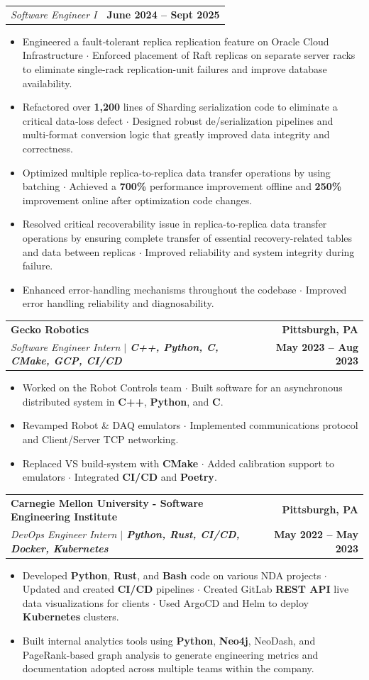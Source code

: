 \documentclass[letterpaper,11pt]{article}
\makeatletter
\newcommand{\resumeItem}[1]{
  \item\small{
    {#1 \vspace{-2pt}}
  }
}
\newcommand{\resumeSubheading}[4]{
  \vspace{-2pt}\item
    \begin{tabular*}{1.0\textwidth}[t]{l@{\extracolsep{\fill}}r}
      \textbf{#1} & \textbf{\small #4}\\
      \textit{\small#3} & \textbf{\small #2}\\
    \end{tabular*}\vspace{-7pt}
}
\newcommand{\resumeSubheadingPromotion}[2]{
  \vspace{-2pt}\item
    \begin{tabular*}{1.0\textwidth}[t]{l@{\extracolsep{\fill}}r}
      \textit{\small#1} & \textbf{\small #2} \\
    \end{tabular*}\vspace{-7pt}
}
\newcommand{\resumeItemListStart}{\begin{itemize}}
\newcommand{\resumeItemListEnd}{\end{itemize}\vspace{-5pt}}
\makeatother
\begin{document}
    \vspace{-1pt}

    \resumeSubheadingPromotion
    {Software Engineer I}{June 2024 -- Sept 2025}
    \resumeItemListStart
    \resumeItem {Engineered a fault‑tolerant replica replication feature on Oracle Cloud Infrastructure $\cdot$ 
    Enforced placement of Raft replicas on separate server racks to eliminate single‑rack replication-unit failures and improve database availability.}
    \resumeItem {Refactored over \textbf{1,200} lines of Sharding serialization code to eliminate a critical data‑loss defect $\cdot$
     Designed robust de/serialization pipelines and multi‑format conversion logic that 
     greatly improved data integrity and correctness.}
    \resumeItem {Optimized multiple replica-to-replica data transfer operations by using batching $\cdot$ Achieved a \textbf{700\%} performance improvement offline and 
    \textbf{250\%} improvement online after optimization code changes.}
    \resumeItem {Resolved critical recoverability issue in replica-to-replica data transfer operations by ensuring complete transfer
    of essential recovery-related tables and data between replicas $\cdot$ Improved reliability and system integrity during failure.}
    \resumeItem {Enhanced error-handling mechanisms throughout the codebase $\cdot$ Improved error handling reliability and diagnosability.}
    \resumeItemListEnd

    \vspace{4pt}

    \resumeSubheading
      {Gecko Robotics}
      {May 2023 -- Aug 2023}
      {Software Engineer Intern $|$ \textbf{\emph{C++, Python, C, CMake, GCP, CI/CD}}}{Pittsburgh, PA}
      \resumeItemListStart
      \resumeItem { Worked on the Robot Controls team $\cdot$ Built software for an asynchronous distributed system in \textbf{C++}, \textbf{Python}, and \textbf{C}.} 
      \resumeItem { Revamped Robot \& DAQ emulators $\cdot$ Implemented communications protocol and Client/Server TCP networking.}
      \resumeItem { Replaced VS build-system with \textbf{CMake} $\cdot$ Added calibration support to emulators $\cdot$ Integrated \textbf{CI/CD} and \textbf{Poetry}.}
      \resumeItemListEnd
    
    \vspace{4pt}

    \resumeSubheading
      {Carnegie Mellon University - Software Engineering Institute }{May 2022 -- May 2023}
      {DevOps Engineer Intern  $|$ \textbf{\emph{Python, Rust, CI/CD, Docker, Kubernetes}}}{Pittsburgh, PA}
      \resumeItemListStart
      \resumeItem {Developed \textbf{Python}, \textbf{Rust}, and \textbf{Bash} code on various NDA projects $\cdot$ Updated and created \textbf{CI/CD} pipelines $\cdot$ Created
        GitLab \textbf{REST API} live data visualizations for clients $\cdot$ Used ArgoCD and Helm to deploy \textbf{Kubernetes} clusters.}
      \resumeItem {Built internal analytics tools using \textbf{Python}, \textbf{Neo4j}, NeoDash, and PageRank-based graph analysis to 
        generate engineering metrics and documentation adopted across multiple teams within the company.}
      \resumeItemListEnd
\end{document}
